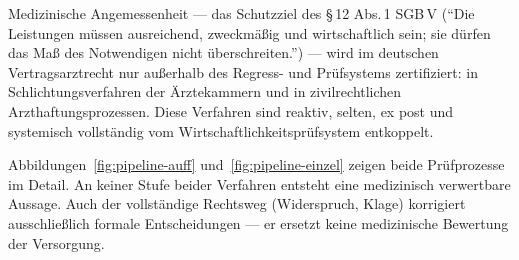 \documentclass{umbruch-position}
\begin{document}
Medizinische Angemessenheit --- das Schutzziel des \S\,12 Abs.\,1 SGB\,V (``Die Leistungen müssen ausreichend, zweckmäßig und wirtschaftlich sein; sie dürfen das Maß des Notwendigen nicht überschreiten.'') --- wird im deutschen Vertragsarztrecht nur außerhalb des Regress- und Prüfsystems zertifiziert: in Schlichtungsverfahren der Ärztekammern und in zivilrechtlichen Arzthaftungsprozessen. Diese Verfahren sind reaktiv, selten, ex post und systemisch vollständig vom Wirtschaftlichkeitsprüfsystem entkoppelt.

Abbildungen~\ref{fig:pipeline-auff} und~\ref{fig:pipeline-einzel} zeigen beide Prüfprozesse im Detail. An keiner Stufe beider Verfahren entsteht eine medizinisch verwertbare Aussage. Auch der vollständige Rechtsweg (Widerspruch, Klage) korrigiert ausschließlich formale Entscheidungen --- er ersetzt keine medizinische Bewertung der Versorgung.
\end{document}
